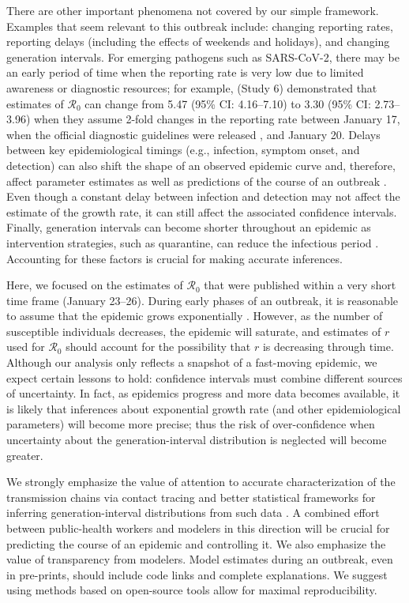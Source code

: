 \documentclass[12pt]{article}
\newcommand{\Ro}{\ensuremath{{\mathcal R}_{0}}\xspace}
\begin{document}
There are other important phenomena not covered by our simple framework. 
Examples that seem relevant to this outbreak include: changing reporting rates, reporting delays (including the effects of weekends and holidays), and changing generation intervals.
For emerging pathogens such as SARS-CoV-2, there may be an early period of time when the reporting rate is very low due to limited awareness or diagnostic resources;
for example, \cite{zhaoncov} (Study 6) demonstrated that estimates of \Ro can change from 5.47 (95\% CI: 4.16--7.10) to 3.30 (95\% CI: 2.73--3.96) when they assume 2-fold changes in the reporting rate between January 17, when the official diagnostic guidelines were released \citep{who17protocol}, and January 20.
Delays between key epidemiological timings (e.g., infection, symptom onset, and detection) can also shift the shape of an observed epidemic curve and, therefore, affect parameter estimates as well as predictions of the course of an outbreak \citep{tariq2019assessing}.
Even though a constant delay between infection and detection may not affect the estimate of the growth rate, it can still affect the associated confidence intervals.
Finally, generation intervals can become shorter throughout an epidemic as intervention strategies, such as quarantine, can reduce the infectious period \citep{hethcote2002effects}.
Accounting for these factors is crucial for making accurate inferences.

Here, we focused on the estimates of \Ro that were published within a very short time frame (January 23--26).
During early phases of an outbreak, it is reasonable to assume that the epidemic grows exponentially \citep{anderson1991infectious}. However, as the number of susceptible individuals decreases, the epidemic will saturate, and estimates of $r$ used for \Ro should account for the possibility that $r$ is decreasing through time.
Although our analysis only reflects a snapshot of a fast-moving epidemic, we expect certain lessons to hold: confidence intervals must combine different sources of uncertainty. 
In fact, as epidemics progress and more data becomes available, it is likely that inferences about exponential growth rate (and other epidemiological parameters) will become more precise; thus the risk of over-confidence when uncertainty about the generation-interval distribution is neglected will become greater.

We strongly emphasize the value of attention to accurate characterization of the transmission chains via contact tracing and better statistical frameworks for inferring generation-interval distributions from such data \citep{britton2019estimation}.
A combined effort between public-health workers and modelers in this direction will be crucial for predicting the course of an epidemic and controlling it.
We also emphasize the value of transparency from modelers.
Model estimates during an outbreak, even in pre-prints, should include code links and complete explanations.
We suggest using methods based on open-source tools allow for maximal reproducibility.
\end{document}
